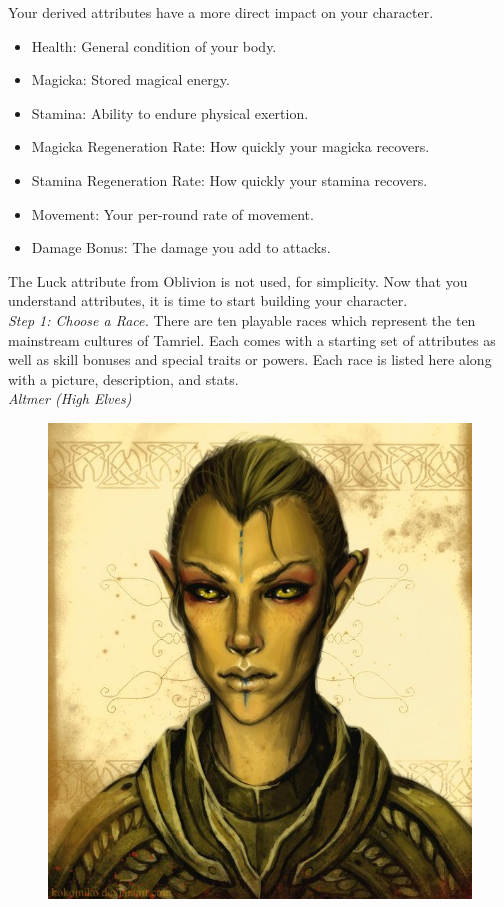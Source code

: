 \documentclass[12pt]{article}
\begin{document}
\noindent
Your derived attributes have a more direct impact on your character.
\begin{itemize}
	\item Health: General condition of your body.
	\item Magicka: Stored magical energy.
	\item Stamina: Ability to endure physical exertion.
	\item Magicka Regeneration Rate: How quickly your magicka recovers.
	\item Stamina Regeneration Rate: How quickly your stamina recovers.
	\item Movement: Your per-round rate of movement.
	\item Damage Bonus: The damage you add to attacks.
\end{itemize}
The Luck attribute from Oblivion is not used, for simplicity. Now that you understand attributes, it is time to start building your character.\\

\textit{Step 1: Choose a Race.}
There are ten playable races which represent the ten mainstream cultures of Tamriel. Each comes with a starting set of attributes as well as skill bonuses and special traits or powers. Each race is listed here along with a picture, description, and stats.\\

\noindent
\textit{Altmer (High Elves)}
\begin{figure}
	\includegraphics[width=\textwidth]{Altmer.png}
\end{figure}
\end{document}
